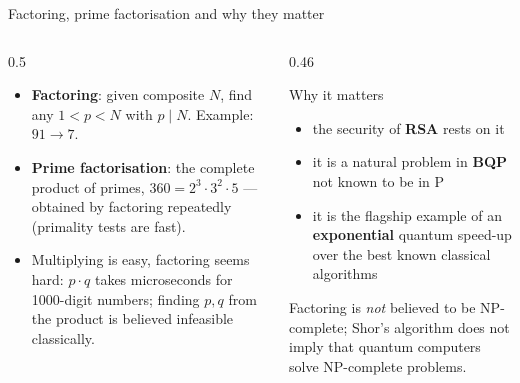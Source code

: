 \documentclass[aspectratio=169,11pt]{beamer}
\newcommand{\hl}[1]{{\color{qorange}\textbf{#1}}}
\newcommand{\key}[1]{{\color{qdark}\textbf{#1}}}
\begin{document}
\begin{frame}[label=fFactoring]{Factoring, prime factorisation and why they matter}
  \begin{columns}[T]
    \begin{column}{0.5\textwidth}
      \small
      \begin{itemize}\itemsep2pt
        \item \key{Factoring}: given composite $N$, find any $1 < p < N$ with $p \mid N$. Example: $91 \to 7$.
        \item \key{Prime factorisation}: the complete product of primes, $360 = 2^3\cdot3^2\cdot5$ --- obtained by factoring repeatedly
              (primality tests are fast).
        \item Multiplying is easy, factoring seems hard: $p \cdot q$ takes microseconds for 1000-digit numbers; finding $p, q$ from the product is believed infeasible classically.
      \end{itemize}
    \end{column}
    \begin{column}{0.46\textwidth}
      \begin{block}{Why it matters}
        \small
        \begin{itemize}\itemsep1pt
          \item the security of \key{RSA} rests on it
          \item it is a natural problem in \key{BQP} not known to be in P
          \item it is the flagship example of an \hl{exponential} quantum speed-up over the best known classical algorithms
        \end{itemize}
      \end{block}
      \scriptsize\color{qgrey} Factoring is \emph{not} believed to be NP-complete; Shor's algorithm does not imply that quantum computers solve NP-complete problems.
    \end{column}
  \end{columns}
\end{frame}
\end{document}

